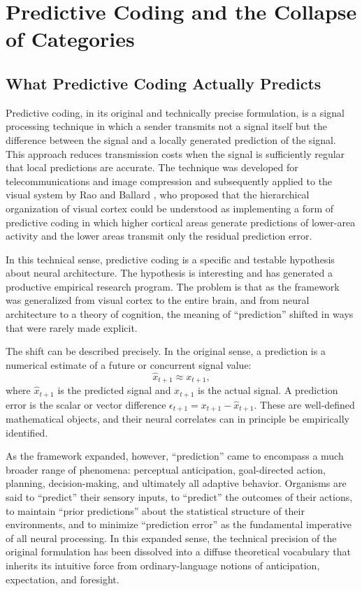 \documentclass[12pt,a4paper]{report}
\theoremstyle{flyxion}
\begin{document}
\chapter{Predictive Coding and the Collapse of Categories}

\section{What Predictive Coding Actually Predicts}

Predictive coding, in its original and technically precise formulation, is a signal processing technique in which a sender transmits not a signal itself but the difference between the signal and a locally generated prediction of the signal. This approach reduces transmission costs when the signal is sufficiently regular that local predictions are accurate. The technique was developed for telecommunications and image compression and subsequently applied to the visual system by Rao and Ballard \cite{rao}, who proposed that the hierarchical organization of visual cortex could be understood as implementing a form of predictive coding in which higher cortical areas generate predictions of lower-area activity and the lower areas transmit only the residual prediction error.

In this technical sense, predictive coding is a specific and testable hypothesis about neural architecture. The hypothesis is interesting and has generated a productive empirical research program. The problem is that as the framework was generalized from visual cortex to the entire brain, and from neural architecture to a theory of cognition, the meaning of ``prediction'' shifted in ways that were rarely made explicit.

The shift can be described precisely. In the original sense, a prediction is a numerical estimate of a future or concurrent signal value:
\[
\hat{x}_{t+1} \approx x_{t+1},
\]
where $\hat{x}_{t+1}$ is the predicted signal and $x_{t+1}$ is the actual signal. A prediction error is the scalar or vector difference $\epsilon_{t+1} = x_{t+1} - \hat{x}_{t+1}$. These are well-defined mathematical objects, and their neural correlates can in principle be empirically identified.

As the framework expanded, however, ``prediction'' came to encompass a much broader range of phenomena: perceptual anticipation, goal-directed action, planning, decision-making, and ultimately all adaptive behavior. Organisms are said to ``predict'' their sensory inputs, to ``predict'' the outcomes of their actions, to maintain ``prior predictions'' about the statistical structure of their environments, and to minimize ``prediction error'' as the fundamental imperative of all neural processing. In this expanded sense, the technical precision of the original formulation has been dissolved into a diffuse theoretical vocabulary that inherits its intuitive force from ordinary-language notions of anticipation, expectation, and foresight.
\end{document}
